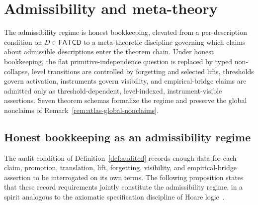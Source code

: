\documentclass[11pt]{article}
\theoremstyle{definition}
\newcommand{\FATCD}{\ensuremath{\mathsf{FATCD}}}
\begin{document}
 \section{Admissibility and meta-theory}\label{sec:admissibility-meta-theory}



The admissibility regime is honest bookkeeping, elevated from a
per-description condition on \(D \in \FATCD{}\) to a meta-theoretic
discipline governing which claims about admissible descriptions enter
the theorem chain. Under honest bookkeeping, the flat
primitive-independence question is replaced by typed non-collapse,
level transitions are controlled by forgetting and selected lifts,
thresholds govern activation, instruments govern visibility, and
empirical-bridge claims are admitted only as threshold-dependent,
level-indexed, instrument-visible assertions. Seven theorem schemas
formalize the regime and preserve the global nonclaims of
Remark~\ref{rem:atlas-global-nonclaims}.

\subsection{Honest bookkeeping as an admissibility regime}\label{subsec:honest-bookkeeping}

The audit condition of Definition~\ref{def:audited} records enough
data for each claim, promotion, translation, lift, forgetting,
visibility, and empirical-bridge assertion to be interrogated on its
own terms. The following proposition states that these record
requirements jointly constitute the admissibility regime, in a spirit
analogous to the axiomatic specification discipline of Hoare
logic~\citep{Hoare1969}.
\end{document}
